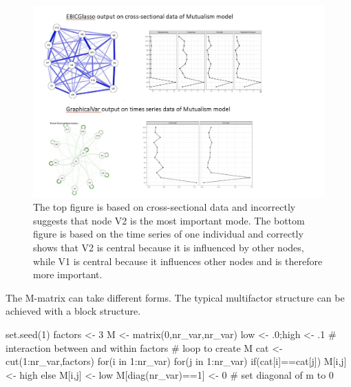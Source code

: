 \documentclass[
  letterpaper,
]{scrbook}
\newenvironment{Shaded}{\begin{snugshade}}{\end{snugshade}}
\newcommand{\CommentTok}[1]{\textcolor[rgb]{0.37,0.37,0.37}{#1}}
\newcommand{\ControlFlowTok}[1]{\textcolor[rgb]{0.00,0.23,0.31}{#1}}
\newcommand{\DecValTok}[1]{\textcolor[rgb]{0.68,0.00,0.00}{#1}}
\newcommand{\FunctionTok}[1]{\textcolor[rgb]{0.28,0.35,0.67}{#1}}
\newcommand{\NormalTok}[1]{\textcolor[rgb]{0.00,0.23,0.31}{#1}}
\newcommand{\OtherTok}[1]{\textcolor[rgb]{0.00,0.23,0.31}{#1}}
\newcommand{\SpecialCharTok}[1]{\textcolor[rgb]{0.37,0.37,0.37}{#1}}
\begin{document}
\begin{figure}

{\centering \includegraphics[width=6.26389in,height=\textheight]{media/ch6/image16.jpg}

}

\caption{\label{fig-ch6-img16-old-85}The top figure is based on
cross-sectional data and incorrectly suggests that node V2 is the most
important mode. The bottom figure is based on the time series of one
individual and correctly shows that V2 is central because it is
influenced by other nodes, while V1 is central because it influences
other nodes and is therefore more important.}

\end{figure}

The M-matrix can take different forms. The typical multifactor structure
can be achieved with a block structure.

\begin{Shaded}
\begin{Highlighting}[]
\FunctionTok{set.seed}\NormalTok{(}\DecValTok{1}\NormalTok{)}
\NormalTok{factors }\OtherTok{\textless{}{-}} \DecValTok{3}
\NormalTok{M }\OtherTok{\textless{}{-}} \FunctionTok{matrix}\NormalTok{(}\DecValTok{0}\NormalTok{,nr\_var,nr\_var)}
\NormalTok{low }\OtherTok{\textless{}{-}}\NormalTok{ .}\DecValTok{0}\NormalTok{;high }\OtherTok{\textless{}{-}}\NormalTok{ .}\DecValTok{1} \CommentTok{\# interaction between and within factors}
\CommentTok{\# loop to create M}
\NormalTok{cat }\OtherTok{\textless{}{-}} \FunctionTok{cut}\NormalTok{(}\DecValTok{1}\SpecialCharTok{:}\NormalTok{nr\_var,factors)}
\ControlFlowTok{for}\NormalTok{(i }\ControlFlowTok{in} \DecValTok{1}\SpecialCharTok{:}\NormalTok{nr\_var)}
  \ControlFlowTok{for}\NormalTok{(j }\ControlFlowTok{in} \DecValTok{1}\SpecialCharTok{:}\NormalTok{nr\_var)}
    \ControlFlowTok{if}\NormalTok{(cat[i]}\SpecialCharTok{==}\NormalTok{cat[j]) M[i,j] }\OtherTok{\textless{}{-}}\NormalTok{ high }\ControlFlowTok{else}\NormalTok{ M[i,j] }\OtherTok{\textless{}{-}}\NormalTok{ low}
\NormalTok{M[}\FunctionTok{diag}\NormalTok{(nr\_var)}\SpecialCharTok{==}\DecValTok{1}\NormalTok{] }\OtherTok{\textless{}{-}} \DecValTok{0} \CommentTok{\# set diagonal of m to 0}
\end{Highlighting}
\end{Shaded}
\end{document}
